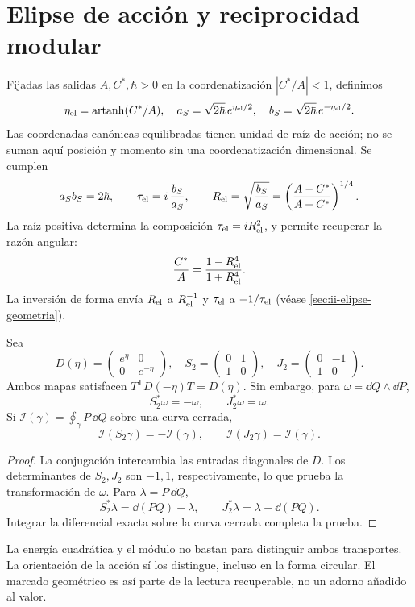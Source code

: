 \section{Elipse de acción y reciprocidad modular}
\label{sec:ellipse}
Fijadas las salidas $A,C^*,\hbar>0$ en la coordenatización
$|C^*/A|<1$, definimos
\[
\eta_{\rm el}=\operatorname{artanh}(C^*/A),\quad
a_S=\sqrt{2\hbar}\,e^{\eta_{\rm el}/2},\quad
b_S=\sqrt{2\hbar}\,e^{-\eta_{\rm el}/2}.
\]
Las coordenadas canónicas equilibradas tienen unidad de raíz de acción;
no se suman aquí posición y momento sin una coordenatización dimensional.
Se cumplen
\[
a_Sb_S=2\hbar,\qquad
\tau_{\rm el}=i\,\frac{b_S}{a_S},\qquad
R_{\rm el}=\sqrt{\frac{b_S}{a_S}}
=\left(\frac{A-C^*}{A+C^*}\right)^{1/4}.
\]
La raíz positiva determina la composición $\tau_{\rm el}=iR_{\rm el}^2$,
y permite recuperar la razón angular:
\[
\frac{C^*}{A}=\frac{1-R_{\rm el}^4}{1+R_{\rm el}^4}.
\]
La inversión de forma envía $R_{\rm el}$ a $R_{\rm el}^{-1}$ y
$\tau_{\rm el}$ a $-1/\tau_{\rm el}$ (véase \ref{sec:ii-elipse-geometria}).

\begin{proposition}
Sea
\[
D(\eta)=\begin{pmatrix}e^\eta&0\\0&e^{-\eta}\end{pmatrix},
\quad
S_2=\begin{pmatrix}0&1\\1&0\end{pmatrix},
\quad
J_2=\begin{pmatrix}0&-1\\1&0\end{pmatrix}.
\]
Ambos mapas satisfacen $T^{\mathsf T}D(-\eta)T=D(\eta)$.
Sin embargo, para $\omega=\dd Q\wedge\dd P$,
\[
S_2^*\omega=-\omega,\qquad J_2^*\omega=\omega.
\]
Si $\mathcal I(\gamma)=\oint_\gamma P\,\dd Q$ sobre una curva cerrada,
\[
\mathcal I(S_2\gamma)=-\mathcal I(\gamma),\qquad
\mathcal I(J_2\gamma)=\mathcal I(\gamma).
\]
\end{proposition}
\begin{proof}
La conjugación intercambia las entradas diagonales de $D$.
Los determinantes de $S_2,J_2$ son $-1,1$, respectivamente, lo que
prueba la transformación de $\omega$. Para $\lambda=P\,\dd Q$,
\[
S_2^*\lambda=\dd(PQ)-\lambda,\qquad
J_2^*\lambda=\lambda-\dd(PQ).
\]
Integrar la diferencial exacta sobre la curva cerrada completa la prueba.
\end{proof}

La energía cuadrática y el módulo no bastan para distinguir ambos
transportes. La orientación de la acción sí los distingue, incluso
en la forma circular. El marcado geométrico es así parte de la lectura
recuperable, no un adorno añadido al valor.
